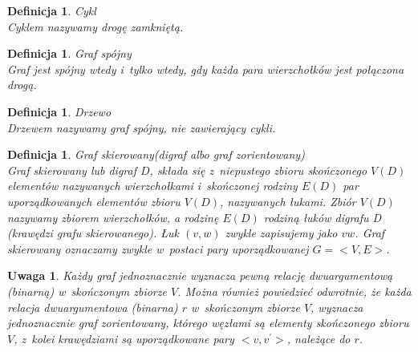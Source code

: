 \documentclass[12pt,a4paper]{report}
\newtheorem{definition}[theorem]{Definicja}
\newtheorem{uwaga}{Uwaga}
\begin{document}
\begin{definition}{Cykl \cite[Rozdział 3]{wilson2008}}\\
Cyklem nazywamy drogę zamkniętą.
\end{definition}


\begin{definition}{Graf spójny \cite[Rozdział 3]{wilson2008}}\\
Graf jest spójny wtedy i~tylko wtedy, gdy każda para wierzchołków jest połączona drogą.
\end{definition}


\begin{definition}{Drzewo \cite[Rozdział 4]{wilson2008}}\\
Drzewem nazywamy graf spójny, nie zawierający cykli.
\end{definition}

\begin{definition}{Graf skierowany(digraf albo graf zorientowany) \cite[Rozdział 7]{wilson2008}}\\
Graf skierowany lub digraf $D$, składa się z~niepustego zbioru skończonego $V(D)$ elementów nazywanych wierzchołkami i~skończonej rodziny $E(D)$ par uporządkowanych elementów zbioru $V(D)$, nazywanych łukami. Zbiór $V(D)$ nazywamy zbiorem wierzchołków, a rodzinę $E(D)$ rodziną łuków digrafu D (krawędzi grafu skierowanego). Łuk $(v,w)$ zwykle zapisujemy jako $vw$. Graf skierowany oznaczamy zwykle w~postaci pary uporządkowanej $G=<V,E>$.
\end{definition}

\begin{uwaga}
Każdy graf jednoznacznie wyznacza pewną relację dwuargumentową (binarną) w~skończonym zbiorze $V$. Można również powiedzieć odwrotnie, że każda relacja dwuargumentowa (binarna) $r$ w~skończonym zbiorze $V$, wyznacza jednoznacznie graf zorientowany, którego węzłami są elementy skończonego zbioru $V$, z~kolei krawędziami są uporządkowane pary $<v,v^{'}>$, należące do $r$. 
\end{uwaga}
\end{document}
